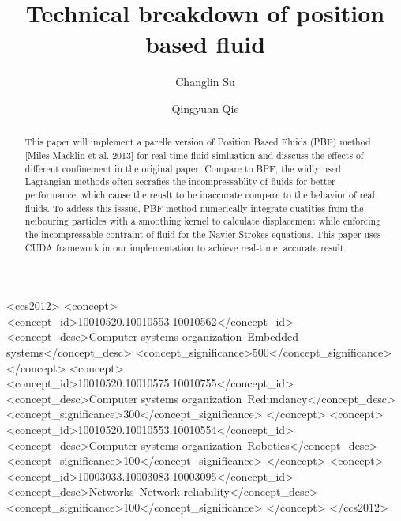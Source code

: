 \documentclass[acmtog]{acmart}
\begin{document}
\title{Technical breakdown of position based fluid}

\author{Changlin Su}
\author{ Qingyuan Qie}
\authornotemark[1]


\renewcommand{\shortauthors}{Trovato and Tobin, et al.}

\begin{abstract}
  This paper will implement a parelle version of Position Based Fluids (PBF) method [Miles Macklin et al. 2013]
for real-time fluid simluation and disscuss the effects of different confinement in the original paper.
Compare to BPF, the widly used Lagrangian methods often secrafies the incompressablity of fluids for better performance, 
which cause the reuslt to be inaccurate compare to the behavior of real fluids. To addess this isssue, 
PBF method numerically integrate quatities from the neibouring particles with a smoothing kernel to calculate displacement
while enforcing the incompressable contraint of fluid for the Navier-Strokes equations.
This paper uses CUDA framework in our implementation to achieve real-time, accurate result.
\end{abstract}

\begin{CCSXML}
<ccs2012>
 <concept>
  <concept_id>10010520.10010553.10010562</concept_id>
  <concept_desc>Computer systems organization~Embedded systems</concept_desc>
  <concept_significance>500</concept_significance>
 </concept>
 <concept>
  <concept_id>10010520.10010575.10010755</concept_id>
  <concept_desc>Computer systems organization~Redundancy</concept_desc>
  <concept_significance>300</concept_significance>
 </concept>
 <concept>
  <concept_id>10010520.10010553.10010554</concept_id>
  <concept_desc>Computer systems organization~Robotics</concept_desc>
  <concept_significance>100</concept_significance>
 </concept>
 <concept>
  <concept_id>10003033.10003083.10003095</concept_id>
  <concept_desc>Networks~Network reliability</concept_desc>
  <concept_significance>100</concept_significance>
 </concept>
</ccs2012>
\end{CCSXML}
\end{document}
